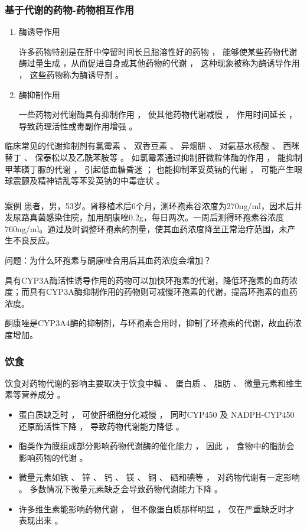 \documentclass[dvipsnames, svgnames, x11names]{beamer}
\begin{document}
\begin{frame}
    \frametitle{基于代谢的药物-药物相互作用}
    \begin{enumerate}
      \item 酶诱导作用
      
      许多药物特别是在肝中停留时间长且脂溶性好的药物 ， 能够使某些药物代谢酶过量生成 ，从而促进自身或其他药物的代谢 ， 这种现象被称为酶诱导作用 ， 这些药物称为酶诱导剂 。 
      \item 酶抑制作用
      
      一些药物对代谢酶具有抑制作用 ， 使其他药物代谢减慢 ， 作用时间延长 ， 导致药理活性或毒副作用增强 。 
    \end{enumerate}
    \begin{blankblock}{}
      临床常见的代谢抑制剂有氯霉素 、 双香豆素 、 异烟肼 、 对氨基水杨酸 、 西咪替丁 、 保泰松以及乙酰苯胺等 。 如氯霉素通过抑制肝微粒体酶的作用 ， 能抑制甲苯磺丁脲的代谢 ， 引起低血糖昏迷 ； 也能抑制苯妥英钠的代谢 ， 可能产生眼球震颤及精神错乱等苯妥英钠的中毒症状 。
    \end{blankblock}
\end{frame}


\begin{frame}[t]
    \frametitle{}
    \begin{block}{案例}
        患者，男，53岁。肾移植术后6个月，测环孢素谷浓度为270ng/ml，因术后并发尿路真菌感染住院，加用酮康唑0.2g，每日两次。一周后测得环孢素谷浓度760ng/ml。通过及时调整环孢素的剂量，使其血药浓度降至正常治疗范围，未产生不良反应。
        
        问题：为什么环孢素与酮康唑合用后其血药浓度会增加？

        \tcblower
        具有CYP3A酶活性诱导作用的药物可以加快环孢素的代谢，降低环孢素的血药浓度；而具有CYP3A酶抑制作用的药物则可减慢环孢素的代谢，提高环孢素的血药浓度。
        \pause

        酮康唑是CYP3A4酶的抑制剂，与环孢素合用时，抑制了环孢素的代谢，故血药浓度增加。
    \end{block}
\end{frame}


\begin{frame}
    \frametitle{饮食}
    饮食对药物代谢的影响主要取决于饮食中糖 、 蛋白质 、 脂肪 、 微量元素和维生素等营养成分 。
    \begin{itemize}
      \item 蛋白质缺乏时 ， 可使肝细胞分化减慢 ， 同时CYP450 及 NADPH-CYP450 还原酶活性下降 ， 导致药物代谢能力降低 。
      \item 脂类作为膜组成部分影响药物代谢酶的催化能力 ， 因此 ， 食物中的脂肪会影响药物的代谢 。
      \item 微量元素如铁 、 锌 、 钙 、 镁 、 铜 、 硒和碘等 ， 对药物代谢有一定影响 。 多数情况下微量元素缺乏会导致药物代谢能力下降 。
      \item 许多维生素能影响药物代谢 ， 但不像蛋白质那样明显 ， 仅在严重缺乏时才表现出来 。
    \end{itemize}
\end{frame}
\end{document}
